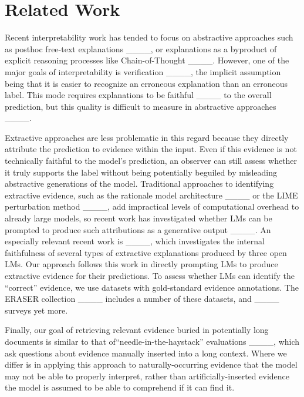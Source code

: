 \section{Related Work}


Recent interpretability work has tended to focus on abstractive approaches such as posthoc free-text explanations ____, or explanations as a byproduct of explicit reasoning processes like Chain-of-Thought ____. However, one of the major goals of interpretability is verification ____, the implicit assumption being that it is easier to recognize an erroneous explanation than an erroneous label. This mode requires explanations to be faithful ____ to the overall prediction, but this quality is difficult to measure in abstractive approaches ____.

Extractive approaches are less problematic in this regard because they directly attribute the prediction to evidence within the input. Even if this evidence is not technically faithful to the model's prediction, an observer can still assess whether it truly supports the label without being potentially beguiled by misleading abstractive generations of the model. Traditional approaches to identifying extractive evidence, such as the rationale model architecture ____ or the LIME perturbation method ____, add impractical levels of computational overhead to already large models, so recent work has investigated whether LMs can be prompted to produce such attributions as a generative output ____. An especially relevant recent work is ____, which investigates the internal faithfulness of several types of extractive explanations produced by three open LMs. Our approach follows this work in directly prompting LMs to produce extractive evidence for their predictions. To assess whether LMs can identify the ``correct'' evidence, we use datasets with gold-standard evidence annotations. The ERASER collection ____ includes a number of these datasets, and ____ surveys yet more. 

Finally, our goal of retrieving relevant evidence buried in potentially long documents is similar to that of``needle-in-the-haystack'' evaluations ____, which ask questions about evidence manually inserted into a long context. Where we differ is in applying this approach to naturally-occurring evidence that the model may not be able to properly interpret, rather than artificially-inserted evidence the model is assumed to be able to comprehend if it can find it.